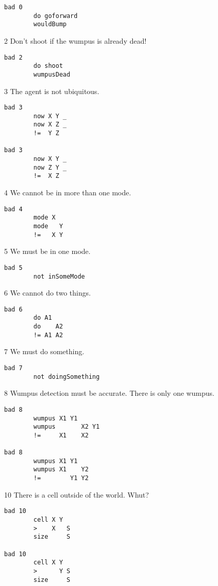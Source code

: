\begin{verbatim}
bad 0
        do goforward
        wouldBump
\end{verbatim}

2 Don't shoot if the wumpus is already dead!

\begin{verbatim}
bad 2
        do shoot
        wumpusDead
\end{verbatim}

3 The agent is not ubiquitous.

\begin{verbatim}
bad 3
        now X Y _
        now X Z _
        !=  Y Z

bad 3
        now X Y _
        now Z Y _
        !=  X Z
\end{verbatim}

4 We cannot be in more than one mode.

\begin{verbatim}
bad 4
        mode X
        mode   Y
        !=   X Y
\end{verbatim}

5 We must be in one mode.

\begin{verbatim}
bad 5
        not inSomeMode
\end{verbatim}

6 We cannot do two things.

\begin{verbatim}
bad 6
        do A1
        do    A2
        != A1 A2
\end{verbatim}

7 We must do something.

\begin{verbatim}
bad 7
        not doingSomething
\end{verbatim}

8 Wumpus detection must be accurate. There is only one wumpus.

\begin{verbatim}
bad 8
        wumpus X1 Y1
        wumpus       X2 Y1
        !=     X1    X2

bad 8
        wumpus X1 Y1
        wumpus X1    Y2
        !=        Y1 Y2
\end{verbatim}

10 There is a cell outside of the world. Whut?

\begin{verbatim}
bad 10
        cell X Y
        >    X   S
        size     S

bad 10
        cell X Y
        >      Y S
        size     S
\end{verbatim}

